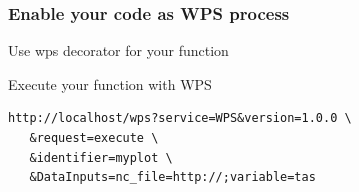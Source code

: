 \documentclass{beamer}
\begin{document}

  \begin{frame}[fragile]
    \frametitle{Enable your code as WPS process}
    \begin{block}{Use wps decorator for your function}
      \tiny
      \lstset{language=python}
      
    \end{block}
    \begin{block}{Execute your function with WPS}
      \begin{verbatim}
http://localhost/wps?service=WPS&version=1.0.0 \
   &request=execute \ 
   &identifier=myplot \
   &DataInputs=nc_file=http://;variable=tas
      \end{verbatim}
    \end{block}
\end{frame}





\end{document}
